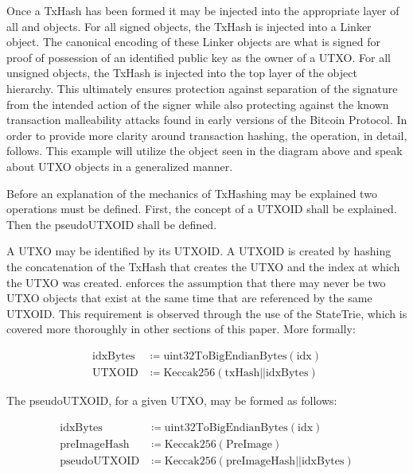 Once a TxHash has been formed it may be injected into the appropriate layer of
all \Vin{} and \Vout{} objects.
For all signed objects, the TxHash is injected into a Linker object.
The canonical encoding of these Linker objects are what is signed for proof
of possession of an identified public key as the owner of a UTXO.
For all unsigned objects, the TxHash is injected into the top layer of the
object hierarchy.
This ultimately ensures protection against separation of the signature from the
intended action of the signer while also protecting against the known
transaction malleability attacks found in early versions of the Bitcoin
Protocol.
In order to provide more clarity around transaction hashing, the operation, in
detail, follows.
This example will utilize the \TxIn{} object seen in the diagram above and speak
about UTXO objects in a generalized manner.

Before an explanation of the mechanics of TxHashing may be explained two
operations must be defined.
First, the concept of a UTXOID shall be explained.
Then the pseudoUTXOID shall be defined.

A UTXO may be identified by its UTXOID.
A UTXOID is created by hashing the concatenation of the TxHash that creates the
UTXO and the \Vout{} index at which the UTXO was created.
\LayerTwoLong{} enforces the assumption that there may never be two UTXO objects
that exist at the same time that are referenced by the same UTXOID.
This requirement is observed through the use of the StateTrie, which is covered
more thoroughly in other sections of this paper.
More formally:

\begin{align*}
    \text{idxBytes} &\coloneqq \text{uint32ToBigEndianBytes}(\text{idx}) \\
    \text{UTXOID} &\coloneqq \text{Keccak256}(\text{txHash}||\text{idxBytes})
\end{align*}

\noindent
The pseudoUTXOID, for a given UTXO, may be formed as follows:

\begin{align*}
    \text{idxBytes} &\coloneqq \text{uint32ToBigEndianBytes}(\text{idx}) \\
    \text{preImageHash} &\coloneqq \text{Keccak256}(\text{PreImage}) \\
    \text{pseudoUTXOID} &\coloneqq \text{Keccak256}(\text{preImageHash} ||
        \text{idxBytes})
\end{align*}

